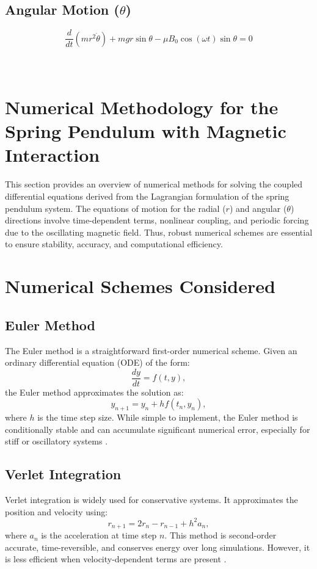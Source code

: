 \documentclass[12pt]{article}
\begin{document}
\subsection{Angular Motion (\( \theta \))}
\[
\frac{d}{dt}\left(mr^2\dot{\theta}\right) + mgr\sin\theta - \mu B_0\cos(\omega t)\sin\theta = 0
\]
\\\\
\section{Numerical Methodology for the Spring Pendulum with Magnetic Interaction}
This section provides an overview of numerical methods for solving the coupled differential equations derived from the Lagrangian formulation of the spring pendulum system. The equations of motion for the radial (\( r \)) and angular (\( \theta \)) directions involve time-dependent terms, nonlinear coupling, and periodic forcing due to the oscillating magnetic field. Thus, robust numerical schemes are essential to ensure stability, accuracy, and computational efficiency.

\section{Numerical Schemes Considered}

\subsection{Euler Method}
The Euler method is a straightforward first-order numerical scheme. Given an ordinary differential equation (ODE) of the form:
\[
\frac{dy}{dt} = f(t, y),
\]
the Euler method approximates the solution as:
\[
y_{n+1} = y_n + h f(t_n, y_n),
\]
where \( h \) is the time step size. While simple to implement, the Euler method is conditionally stable and can accumulate significant numerical error, especially for stiff or oscillatory systems \cite{press2007numerical}.

\subsection{Verlet Integration}
Verlet integration is widely used for conservative systems. It approximates the position and velocity using:
\[
r_{n+1} = 2r_n - r_{n-1} + h^2 a_n,
\]
where \( a_n \) is the acceleration at time step \( n \). This method is second-order accurate, time-reversible, and conserves energy over long simulations. However, it is less efficient when velocity-dependent terms are present \cite{hairer1993solving}.
\end{document}
